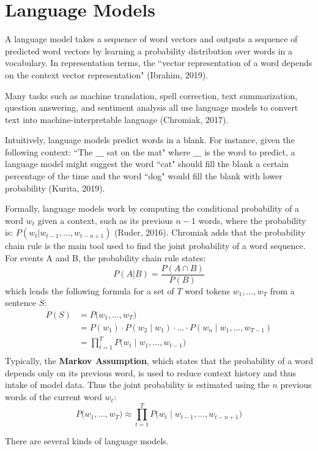 \section{Language Models}

A language model takes a sequence of word vectors and outputs a sequence of predicted word vectors by learning a probability distribution over words in a vocabulary. In representation terms, the ``vector representation of a word depends on the context vector representation" (Ibrahim, 2019).

Many tasks such as machine translation, spell correction, text summarization, question answering, and sentiment analysis all use language models to convert text into machine-interpretable language (Chromiak, 2017). 

Intuitively, language models predict words in a blank. For instance, given the following context: ``The $\_\_\_$ sat on the mat" where $\_\_\_$ is the word to predict, a language model might suggest the word ``cat" should fill the blank a certain percentage of the time and the word ``dog" would fill the blank with lower probability (Kurita, 2019). 

Formally, language models work by computing the conditional probability of a word $w_t$ given a context, such as its previous $n-1$ words, where the probability is: $P(w_t | w_{t-1}, ..., w_{t-n+1})$ (Ruder, 2016). Chromiak adds that the probability chain rule is the main tool used to find the joint probability of a word sequence. For events A and B, the probability chain rule states:
$$
P(A | B) = \frac{P(A \cap B)} {P(B)}
$$
which lends the following formula for a set of $T$ word tokens $w_1, ..., w_T$ from a sentence $S$: 
$$
\begin{array}{ll}
P(S)
&= P \Big(w_1, ..., w_T \Big)  \\
&= P(w_1) \cdot P(w_2 \; | \; w_1) \cdot ... \cdot P(w_n \; | \; w_1, ..., w_{T-1}) \\
&= \prod_{t=1}^T P \Big(w_t \; | \; w_1, ..., w_{t-1} \Big) \\
\end{array}
$$
Typically, the \textbf{Markov Assumption}, which states that the probability of a word depends only on its previous word, is used to reduce context history and thus intake of model data. Thus the joint probability is estimated using the $n$ previous words of the current word $w_t$:
$$
P \Big(w_1, ..., w_T \Big) \approx \prod_{t=1}^T P \Big(w_t \; | \; w_{t-1}, ..., w_{t-n+1} \Big)
$$

There are several kinds of language models. 

